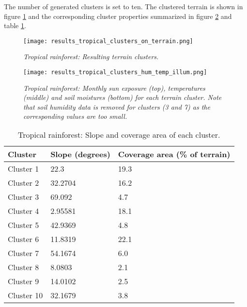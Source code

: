 The number of generated clusters is set to ten. The clustered terrain is shown in figure \ref{fig:results_tropical_terrain_clusters} and the corresponding cluster properties summarized in figure \ref{fig:results_tropical_cluster_hum_temp_illum} and table \ref{tab:results_tropical_cluster_slope_covarea}. 

\begin{figure}[htb!]
\center
	\texttt{[image: results\_tropical\_clusters\_on\_terrain.png]}
	\caption{ \textit{Tropical rainforest: Resulting terrain clusters.} }
	\label{fig:results_tropical_terrain_clusters}
\end{figure}

\begin{figure}[htb!]
\center
	\texttt{[image: results\_tropical\_clusters\_hum\_temp\_illum.png]}
	\caption{ \textit{Tropical rainforest: Monthly sun exposure (top), temperatures (middle) and soil moistures (bottom) for each terrain cluster. Note that soil humidity data is removed for clusters (3 and 7) as the corresponding values are too small.}}
	\label{fig:results_tropical_cluster_hum_temp_illum}
\end{figure}

\begin{table}[htb!]
  \centering
	    \begin{tabular}{|p{5cm}|p{5cm}|p{5cm}|}
		\hline	
  	    \textbf{Cluster} & \textbf{Slope (degrees)} & \textbf{Coverage area (\% of terrain)} \\
  	    \hline	
		Cluster 1 & 22.3 & 19.3 \\
		\hline
		Cluster 2 & 32.2704 & 16.2 \\
		\hline
		Cluster 3 & 69.092 & 4.7 \\
		\hline
		Cluster 4 & 2.95581 & 18.1 \\
		\hline
		Cluster 5 & 42.9369 & 4.8 \\
		\hline
		Cluster 6 & 11.8319 & 22.1 \\
		\hline
		Cluster 7 & 54.1674 & 6.0 \\
		\hline
		Cluster 8 & 8.0803 & 2.1 \\
		\hline
		Cluster 9 & 14.0102 & 2.5 \\
		\hline
		Cluster 10 & 32.1679 & 3.8 \\
		\hline
		\end{tabular}
		\caption{Tropical rainforest: Slope and coverage area of each cluster.}
	  \label{tab:results_tropical_cluster_slope_covarea}
\end{table}

